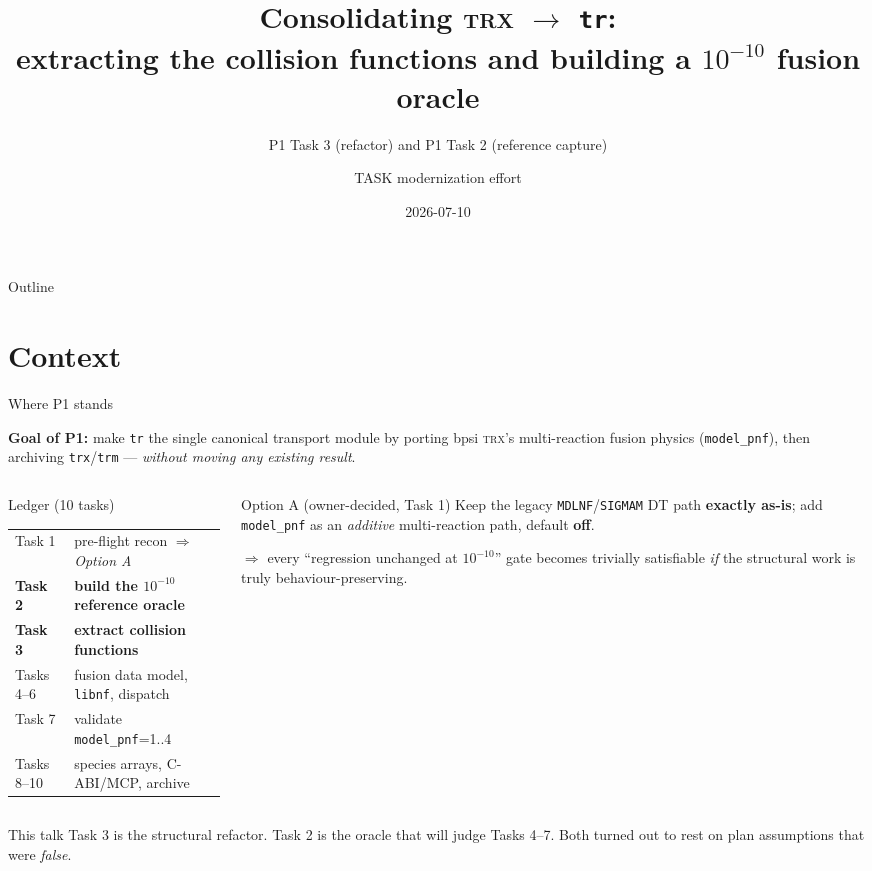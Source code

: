 \documentclass[10pt,aspectratio=169]{beamer}
\title[P1 Tasks 2 \& 3]{Consolidating \textsc{trx} $\to$ \texttt{tr}:\\
extracting the collision functions and building a $10^{-10}$ fusion oracle}
\subtitle{P1 Task 3 (refactor) and P1 Task 2 (reference capture)}
\author{TASK modernization effort}
\institute[]{Plasma simulation stack --- P1 fusion port, Tasks 1--3 of 10 complete}
\date{2026-07-10}
\newcommand{\C}[1]{\texttt{\small #1}}          %
\begin{document}
\begin{frame}[plain]\titlepage\end{frame}

\begin{frame}{Outline}
  \tableofcontents
\end{frame}

\section{Context}

\begin{frame}{Where P1 stands}

\textbf{Goal of P1:} make \C{tr} the single canonical transport module by porting bpsi \textsc{trx}'s
multi-reaction fusion physics (\C{model\_pnf}), then archiving \C{trx}/\C{trm} --- \emph{without moving
any existing result}.

\vspace{0.5em}
\begin{columns}[T]
\begin{column}{0.52\textwidth}
\begin{block}{Ledger (10 tasks)}
\small
\begin{tabular}{@{}ll@{}}
\toprule
Task 1 & pre-flight recon $\Rightarrow$ \emph{Option A} \\
\textbf{Task 2} & \textbf{build the $10^{-10}$ reference oracle} \\
\textbf{Task 3} & \textbf{extract collision functions} \\
Tasks 4--6 & fusion data model, \C{libnf}, dispatch \\
Task 7 & validate \C{model\_pnf}=1..4 \\
Tasks 8--10 & species arrays, C-ABI/MCP, archive \\
\bottomrule
\end{tabular}
\end{block}
\end{column}
\begin{column}{0.44\textwidth}
\begin{block}{Option A (owner-decided, Task 1)}
\small
Keep the legacy \C{MDLNF}/\C{SIGMAM} DT path \textbf{exactly as-is}; add \C{model\_pnf} as an
\emph{additive} multi-reaction path, default \textbf{off}.

\medskip
$\Rightarrow$ every ``regression unchanged at $10^{-10}$'' gate becomes trivially satisfiable
\emph{if} the structural work is truly behaviour-preserving.
\end{block}
\end{column}
\end{columns}

\vspace{0.4em}
\begin{alertblock}{This talk}
Task 3 is the structural refactor. Task 2 is the oracle that will judge Tasks 4--7.
Both turned out to rest on plan assumptions that were \emph{false}.
\end{alertblock}
\end{frame}
\end{document}
